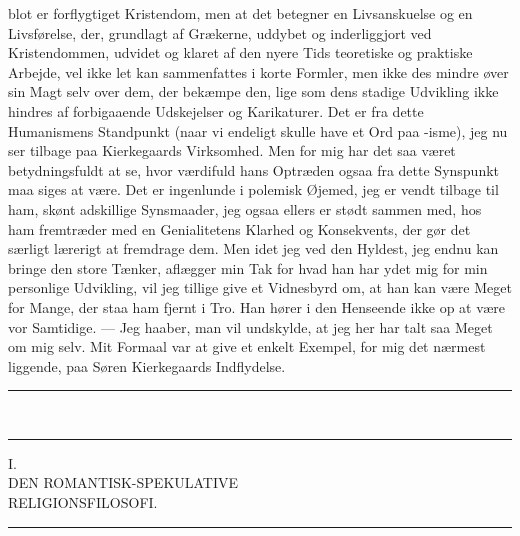 \documentclass[12pt,a4paper,openany]{book}
\newcommand{\opage}[1]{\marginnote{\footnotesize\textit{[#1]}}}
\begin{document}
blot er forflygtiget Kristendom, men at det betegner en
Livsanskuelse og en Livsførelse, der, grundlagt af Grækerne,
uddybet og inderliggjort ved Kristendommen, udvidet
og klaret af den nyere Tids teoretiske og praktiske
Arbejde, vel ikke let kan sammenfattes i korte Formler,
men ikke des mindre øver sin Magt selv over dem, der
bekæmpe den, lige som dens stadige Udvikling ikke hindres
af forbigaaende Udskejelser og Karikaturer. Det er
fra dette Humanismens Standpunkt (naar vi endeligt
skulle have et Ord paa -isme), jeg nu ser tilbage paa
Kierkegaards Virksomhed. Men for mig har det saa
været betydningsfuldt at se, hvor værdifuld hans Optræden
ogsaa fra dette Synspunkt maa siges at være. Det
er ingenlunde i polemisk Øjemed, jeg er vendt tilbage til
ham, skønt adskillige Synsmaader, jeg ogsaa ellers er
stødt sammen med, hos ham fremtræder med en Genialitetens
Klarhed og Konsekvents, der gør det særligt lærerigt
at fremdrage dem. Men idet jeg ved den Hyldest,
jeg endnu kan bringe den store Tænker, aflægger min
Tak for hvad han har ydet mig for min personlige Udvikling,
vil jeg tillige give et Vidnesbyrd om, at han
kan være Meget for Mange, der staa ham fjernt i Tro.
Han hører i den Henseende ikke op at være vor Samtidige.
--- Jeg haaber, man vil undskylde, at jeg her har
talt saa Meget om mig selv. Mit Formaal var at give
et enkelt Exempel, for mig det nærmest liggende, paa
Søren Kierkegaards Indflydelse.
\begin{center}\rule{2cm}{0.4pt}\\[-8pt]\rule{2cm}{0.4pt}\end{center}
\clearpage

\opage{5}\begin{center}I.\\[4pt] DEN ROMANTISK-SPEKULATIVE\\ RELIGIONSFILOSOFI.\\[4pt]\rule{1.5cm}{0.4pt}\end{center}
\end{document}
